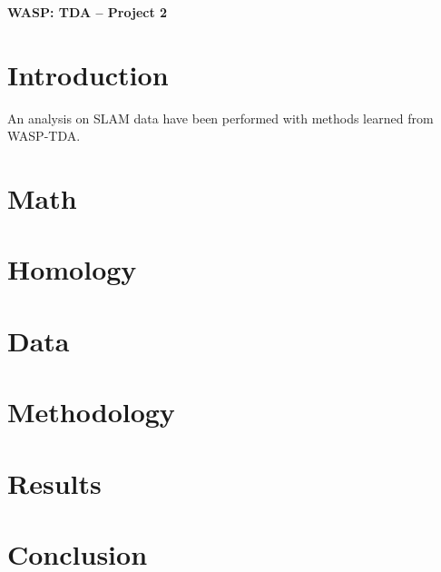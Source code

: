 \documentclass[11pt,compsoc,a4paper]{IEEEtran}
\begin{document}
\onecolumn




\newcommand{\proname}{TEBA}
\begin{center}
    \Large{\textbf{WASP: TDA -- Project 2}}\\ \vspace{0.25cm} 
\end{center}

\setcounter{section}{2}
\section*{\Large{Introduction}}
An analysis on SLAM data have been performed with methods learned from WASP-TDA.


\section*{\Large{Math}}



\section*{\Large{Homology}}



\section*{\Large{Data}}



\section*{\Large{Methodology}}



\section*{\Large{Results}}



\section*{\Large{Conclusion}}


\subsection{}
{

}


%
\printbibliography
\end{document}
